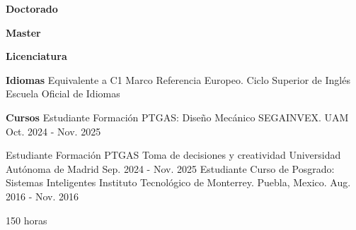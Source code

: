 


\begin{cventries}
\textbf{Doctorado}

\textbf{Master}

\textbf{Licenciatura}

\textbf{Idiomas}
\cventry
{Equivalente a C1 Marco Referencia Europeo.}
{Ciclo Superior de Inglés}
{Escuela Oficial de Idiomas}
{}
{}

\textbf{Cursos}
  \cventry
    {Estudiante} %
    {Formación PTGAS: Diseño Mecánico} %
    {SEGAINVEX. UAM} %
    {Oct. 2024 - Nov. 2025} %
    {
    }
    
  \cventry
    {Estudiante} %
    {Formación PTGAS Toma de decisiones y creatividad} %
    {Universidad Autónoma de Madrid} %
    {Sep. 2024 - Nov. 2025} %
    {
    }
  \cventry
    {Estudiante} %
    {Curso de Posgrado: Sistemas Inteligentes} %
    {Instituto Tecnológico de Monterrey. Puebla, Mexico.} %
    {Aug. 2016 - Nov. 2016} %
    {
      \begin{cvitems} %
        \item {150 horas}
      \end{cvitems}
    }


\end{cventries}
